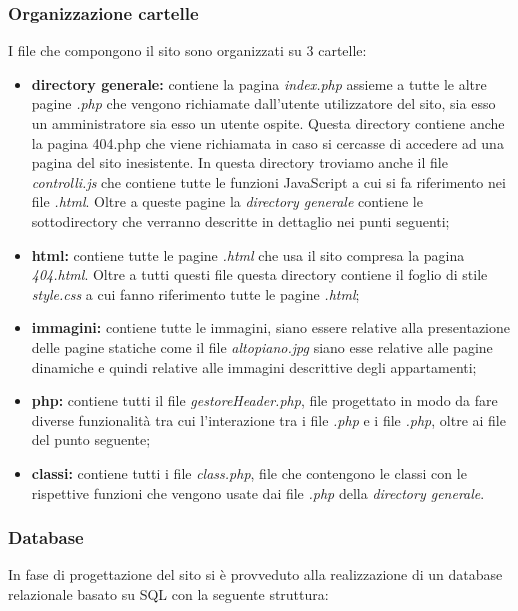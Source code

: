 \documentclass[12pt]{article}
\begin{document}
\subsubsection{Organizzazione cartelle}
I file che compongono il sito sono organizzati su 3 cartelle:
\begin{itemize}
\item \textbf{directory generale:} contiene la pagina \textit{index.php} assieme a tutte le altre pagine \textit{.php} che vengono richiamate dall'utente utilizzatore del sito, sia esso un amministratore sia esso un utente ospite. Questa directory contiene anche la pagina 404.php che viene richiamata in caso si cercasse di accedere ad una pagina del sito inesistente. In questa directory troviamo anche il file \textit{controlli.js} che contiene tutte le funzioni JavaScript a cui si fa riferimento nei file \textit{.html}. Oltre a queste pagine la \textit{directory generale} contiene le sottodirectory che verranno descritte in dettaglio nei punti seguenti;
\item \textbf{html:} contiene tutte le pagine \textit{.html} che usa il sito compresa la pagina \textit{404.html}. Oltre a tutti questi file questa directory contiene il foglio di stile \textit{style.css} a cui fanno riferimento tutte le pagine \textit{.html};
\item \textbf{immagini:} contiene tutte le immagini, siano essere relative alla presentazione delle pagine statiche come il file \textit{altopiano.jpg} siano esse relative alle pagine dinamiche e quindi relative alle immagini descrittive degli appartamenti;
\item \textbf{php:} contiene tutti il file \textit{gestoreHeader.php}, file progettato in modo da fare diverse funzionalità tra cui l'interazione tra i file \textit{.php} e i file \textit{.php}, oltre ai file del punto seguente;
\item \textbf{classi:} contiene tutti i file \textit{class.php}, file che contengono le classi con le rispettive funzioni che vengono usate dai file \textit{.php} della \textit{directory generale}.
\end{itemize}

\newpage
\subsubsection{Database}
In fase di progettazione del sito si è provveduto alla realizzazione di un database relazionale basato su SQL con la seguente struttura:
\end{document}
